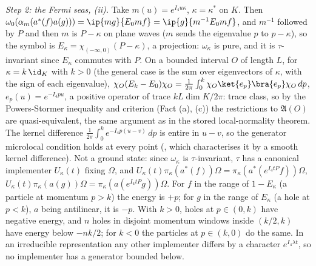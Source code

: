 \emph{Step 2: the Fermi seas, (ii).} Take $m(u) = e^{I_{4}u\kappa}$, $\kappa = \kappa^{*}$ on $K$. Then $\omega_{0}(\alpha_{m}(a^{*}(f)a(g))) = \ip{mg}{E_{0}mf} = \ip{g}{m^{-1}E_{0}mf}$, and $m^{-1}$ followed by $P$ and then $m$ is $P - \kappa$ on plane waves ($m$ sends the eigenvalue $p$ to $p - \kappa$), so the symbol is $E_{\kappa} = \chi_{(-\infty,0)}(P - \kappa)$, a projection: $\omega_{\kappa}$ is pure, and it is $\tau$-invariant since $E_{\kappa}$ commutes with $P$. On a bounded interval $O$ of length $L$, for $\kappa = k\,\id_{K}$ with $k > 0$ (the general case is the sum over eigenvectors of $\kappa$, with the sign of each eigenvalue), $\chi_{O}(E_{k} - E_{0})\chi_{O} = \frac{1}{2\pi}\int_{0}^{k}\chi_{O}\ket{e_{p}}\bra{e_{p}}\chi_{O}\,dp$, $e_{p}(u) = e^{-I_{4}pu}$, a positive operator of trace $kL\dim K/2\pi$: trace class, so by the Powers-Stormer inequality and criterion (Fact (a), (c)) the restrictions to $\mathfrak{A}(O)$ are quasi-equivalent, the same argument as in the stored local-normality theorem. The kernel difference $\frac{1}{2\pi}\int_{0}^{k}e^{-I_{4}p(u - v)}\,dp$ is entire in $u - v$, so the generator microlocal condition holds at every point (, which characterises it by a smooth kernel difference).
Not a ground state: since $\omega_{\kappa}$ is $\tau$-invariant, $\tau$ has a canonical implementer $U_{\kappa}(t)$ fixing $\Omega$, and $U_{\kappa}(t)\pi_{\kappa}(a^{*}(f))\Omega = \pi_{\kappa}(a^{*}(e^{I_{4}tP}f))\Omega$, $U_{\kappa}(t)\pi_{\kappa}(a(g))\Omega = \pi_{\kappa}(a(e^{I_{4}tP}g))\Omega$. For $f$ in the range of $1 - E_{\kappa}$ (a particle at momentum $p > k$) the energy is $+p$; for $g$ in the range of $E_{\kappa}$ (a hole at $p < k$), $a$ being antilinear, it is $-p$. With $k > 0$, holes at $p \in (0, k)$ have negative energy, and $n$ holes in disjoint momentum windows inside $(k/2, k)$ have energy below $-nk/2$; for $k < 0$ the particles at $p \in (k, 0)$ do the same. In an irreducible representation any other implementer differs by a character $e^{I_{4}\lambda t}$, so no implementer has a generator bounded below.
